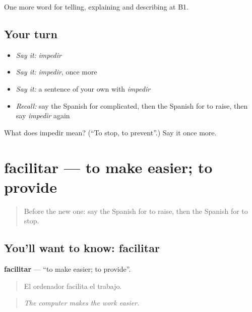 \begin{grammarlens}[title={What you've built}]
One more word for telling, explaining and describing at B1.
\end{grammarlens}

\subsection*{Your turn}
\begin{itemize}
\raggedright
  \item \emph{Say it:} \emph{impedir}
  \item \emph{Say it:} \emph{impedir}, once more
  \item \emph{Say it:} a sentence of your own with \emph{impedir}
  \item \emph{Recall:} say the Spanish for complicated, then the Spanish for to raise, then say \emph{impedir} again
\end{itemize}

\begin{tcolorbox}[breakable,colback=teal!4,colframe=teal!35!black,title={Before you move on}]
What does impedir mean? (\textquotedblleft{}To stop, to prevent\textquotedblright{}.) Say it once more.
\end{tcolorbox}
\section[facilitar]{facilitar — to make easier; to provide}

\label{lesson:ES-C621-facilitar}



\begin{quote}
Before the new one: say the Spanish for to raise, then the Spanish for to stop.
\end{quote}

\subsection*{You'll want to know: facilitar}
\textbf{facilitar} — \textquotedblleft{}to make easier; to provide\textquotedblright{}.

\begin{quote}
El ordenador facilita el trabajo.
\end{quote}

\begin{quote}
\emph{The computer makes the work easier.}
\end{quote}

